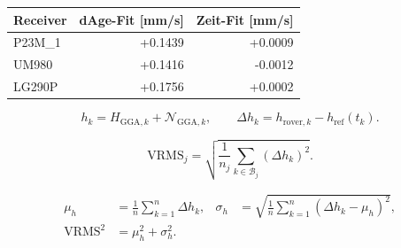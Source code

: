 \documentclass[11pt,a4paper]{article}
\numberwithin{equation}{section}
\numberwithin{figure}{section}
\begin{document}
\begin{center}\begin{lrbox}{\reporttable}\small\setlength{\tabcolsep}{4pt}\begin{tabular}{lrr}\toprule
Receiver & dAge-Fit [mm/\allowbreak{}s] & Zeit-Fit [mm/\allowbreak{}s]\\\midrule
P23M\_1 & +0.1439 & +0.0009\\
UM980 & +0.1416 & -0.0012\\
LG290P & +0.1756 & +0.0002\\
\bottomrule\end{tabular}\end{lrbox}\ifdim\wd\reporttable>\linewidth\resizebox{\linewidth}{!}{\usebox{\reporttable}}\else\usebox{\reporttable}\fi\end{center}

\begin{equation}h_k=H_{\mathrm{GGA},k}+\mathcal N_{\mathrm{GGA},k},\qquad \Delta h_k=h_{\mathrm{rover},k}-h_{\mathrm{ref}}(t_k).\label{eq:de-height}\end{equation}

\begin{equation}\mathrm{VRMS}_j=\sqrt{\frac{1}{n_j}\sum_{k\in\mathcal B_j}(\Delta h_k)^2}.\label{eq:de-vrms}\end{equation}

\begin{equation}\begin{aligned}\mu_h&=\frac{1}{n}\sum_{k=1}^{n}\Delta h_k,& \sigma_h&=\sqrt{\frac{1}{n}\sum_{k=1}^{n}(\Delta h_k-\mu_h)^2},\\ \mathrm{VRMS}^2&=\mu_h^2+\sigma_h^2.\end{aligned}\label{eq:de-bias}\end{equation}
\end{document}
